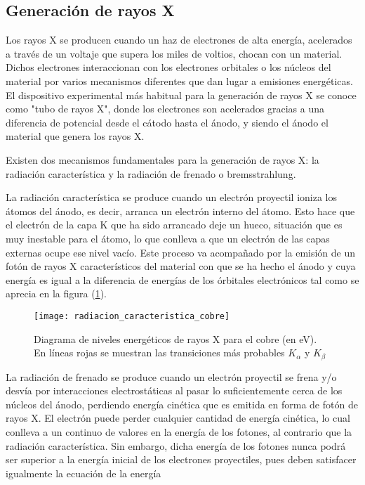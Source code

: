 \subsection{Generación de rayos X}

Los rayos X se producen cuando un haz de electrones de alta energía, acelerados a través de un voltaje que supera los miles de voltios, chocan con un material. Dichos electrones interaccionan con los electrones orbitales o los núcleos del material por varios mecanismos diferentes que dan lugar a emisiones energéticas. El dispositivo experimental más habitual para la generación de rayos X se conoce como "tubo de rayos X", donde los electrones son acelerados gracias a una diferencia de potencial desde el cátodo hasta el ánodo, y siendo el ánodo el material que genera los rayos X.

Existen dos mecanismos fundamentales para la generación de rayos X: la radiación característica y la radiación de frenado o bremsstrahlung. 

La radiación característica se produce cuando un electrón proyectil ioniza los átomos del ánodo, es decir, arranca un electrón interno del átomo. Esto hace que el electrón de la capa K que ha sido arrancado deje un hueco, situación que es muy inestable para el átomo, lo que conlleva a que un electrón de las capas externas ocupe ese nivel vacío. Este proceso va acompañado por la emisión de un fotón de rayos X característicos del material con que se ha hecho el ánodo y cuya energía es igual a la diferencia de energías de los órbitales electrónicos tal como se aprecia en la figura (\ref{figure_radiacion_cobre}).

\begin{figure}[t]
	\texttt{[image: radiacion\_caracteristica\_cobre]}
	\caption{Diagrama de niveles energéticos de rayos X para el cobre (en eV). En líneas rojas se muestran las transiciones más probables $K_{\alpha}$ y $K_{\beta}$}
	\label{figure_radiacion_cobre}
\end{figure}

La radiación de frenado se produce cuando un electrón proyectil se frena y/o desvía por interacciones electrostáticas al pasar lo suficientemente cerca de los núcleos del ánodo, perdiendo energía cinética que es emitida en forma de fotón de rayos X. El electrón puede perder cualquier cantidad de energía cinética, lo cual conlleva a un continuo de valores en la energía de los fotones, al contrario que la radiación característica. Sin embargo, dicha energía de los fotones nunca podrá ser superior a la energía inicial de los electrones proyectiles, pues deben satisfacer igualmente la ecuación de la energía

